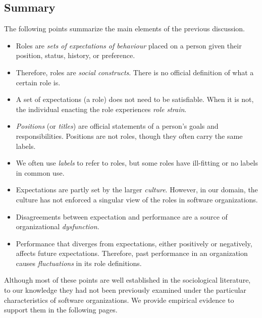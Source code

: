 \documentclass[10pt, conference, compsocconf]{IEEEtran}
\begin{document}
\subsection{Summary}

The following points summarize the main elements of the previous discussion.

\begin{itemize}
\item Roles are \emph{sets of expectations of behaviour} placed on a person given their position, status, history, or preference.

\item Therefore, roles are \emph{social constructs}. There is no official definition of what a certain role is.

\item A set of expectations (a role) does not need to be satisfiable. When it is not, the individual enacting the role experiences \emph{role strain}.

\item \emph{Positions} (or \emph{titles}) are official statements of a person's goals and responsibilities. Positions are not roles, though they often carry the same labels.

\item We often use \emph{labels} to refer to roles, but some roles have ill-fitting or no labels in common use.

\item Expectations are partly set by the larger \emph{culture}. However, in our domain, the culture has not enforced a singular view of the roles in software organizations.

\item Disagreements between expectation and performance are a source of organizational \emph{dysfunction}.

\item Performance that diverges from expectations, either positively or negatively, affects future expectations. Therefore, past performance in an organization causes \emph{fluctuations} in its role definitions.
\end{itemize}

Although most of these points are well established in the sociological literature, to our knowledge they had not been previously examined under the particular characteristics of software organizations. We provide empirical evidence to support them in the following pages.

\end{document}
